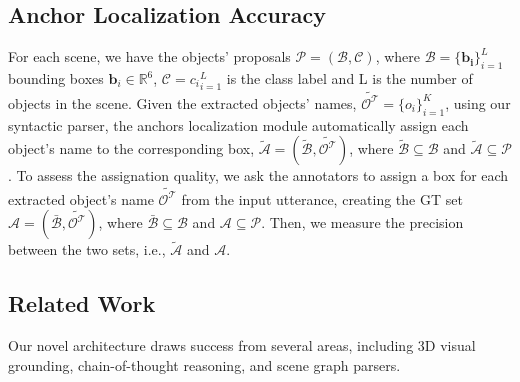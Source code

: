 \subsection{Anchor Localization Accuracy}
\label{appendix_anchor_loc_acc}
For each scene, we have the objects' proposals $\mathcal{P} = (\mathcal{B}, \mathcal{C})$, 
where $\mathcal{B} = \{\mathbf{b_i}\}_{i=1}^{L}$ bounding boxes $\mathbf{b}_i \in \mathbb{R}^6$,
$\mathcal{C} = { c_i}_{i=1}^{L}$ is the class label and L is the number of objects in the scene.
Given the extracted objects' names, $\widetilde{\mathcal{O^T}} = \{o_i\}_{i=1}^{K}$, using our syntactic parser, the anchors localization module automatically assign each object's name to the corresponding box, $\mathcal{\widetilde{A}}  = (\mathcal{\widetilde{B}}, \widetilde{\mathcal{O^T}})$, where $\mathcal{\widetilde{B}} \subseteq \mathcal{B}$ and $\mathcal{\widetilde{A}} \subseteq \mathcal{P}$.
To assess the assignation quality, we ask the annotators to assign a box for each extracted object's name $\widetilde{\mathcal{O^T}}$ from the input utterance, creating the GT set $\mathcal{A}  = (\mathcal{\bar{B}}, \widetilde{\mathcal{O^T}})$, where $\mathcal{\bar{B}} \subseteq \mathcal{B}$ and $\mathcal{A} \subseteq \mathcal{P}$.
Then, we measure the precision between the two sets, i.e., $\mathcal{\widetilde{A}}$ and $\mathcal{A}$.

\subsection{Related Work}
\label{appendix_related_work}

Our novel architecture draws success from several areas, including 3D visual grounding, chain-of-thought reasoning, and scene graph parsers.

